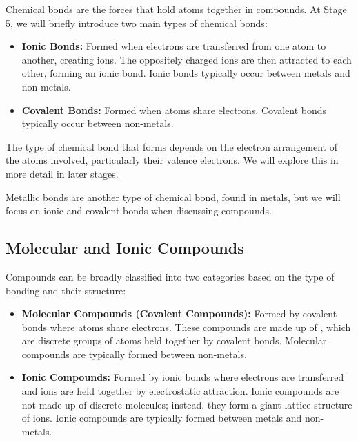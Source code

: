 Chemical bonds are the forces that hold atoms together in compounds. At Stage 5, we will briefly introduce two main types of chemical bonds:

\begin{itemize}
    \item \textbf{Ionic Bonds:} Formed when electrons are transferred from one atom to another, creating ions. The oppositely charged ions are then attracted to each other, forming an ionic bond.  Ionic bonds typically occur between metals and non-metals.  
    \item \textbf{Covalent Bonds:} Formed when atoms share electrons. Covalent bonds typically occur between non-metals. 
\end{itemize}

\begin{marginnote}
  The type of chemical bond that forms depends on the electron arrangement of the atoms involved, particularly their valence electrons. We will explore this in more detail in later stages.
\end{marginnote}

Metallic bonds are another type of chemical bond, found in metals, but we will focus on ionic and covalent bonds when discussing compounds.

\subsection{Molecular and Ionic Compounds}

Compounds can be broadly classified into two categories based on the type of bonding and their structure:

\begin{itemize}
    \item \textbf{Molecular Compounds (Covalent Compounds):}  Formed by covalent bonds where atoms share electrons.  These compounds are made up of , which are discrete groups of atoms held together by covalent bonds.  Molecular compounds are typically formed between non-metals.  
    \item \textbf{Ionic Compounds:} Formed by ionic bonds where electrons are transferred and ions are held together by electrostatic attraction.  Ionic compounds are not made up of discrete molecules; instead, they form a giant lattice structure of ions. Ionic compounds are typically formed between metals and non-metals. 
\end{itemize}


